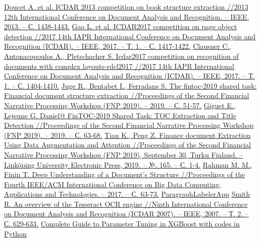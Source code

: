 \documentclass[10pt, a4paper]{ieeeconf}
\begin{document}
\begin{thebibliography}{99}

 \href{https://hal.archives-ouvertes.fr/hal-01073396/document}{Doucet A. et al. ICDAR 2013 competition on book structure extraction //2013 12th International Conference on Document Analysis and Recognition. – IEEE, 2013. – С. 1438-1443.}
 \href{https://ieeexplore.ieee.org/abstract/document/8270162}{Gao L. et al. ICDAR2017 competition on page object detection //2017 14th IAPR International Conference on Document Analysis and Recognition (ICDAR). – IEEE, 2017. – Т. 1. – С. 1417-1422.}
 \href{https://usir.salford.ac.uk/id/eprint/44369/1/ICDAR2017%20Competition%20on%20Recognition%20of%20Documents%20with%20Complex%20Layouts.pdf}{Clausner C., Antonacopoulos A., Pletschacher S. Icdar2017 competition on recognition of documents with complex layouts-rdcl2017 //2017 14th IAPR International Conference on Document Analysis and Recognition (ICDAR). – IEEE, 2017. – Т. 1. – С. 1404-1410.}
 \href{https://www.aclweb.org/anthology/W19-6407.pdf}{Juge R., Bentabet I., Ferradans S. The fintoc-2019 shared task: Financial document structure extraction //Proceedings of the Second Financial Narrative Processing Workshop (FNP 2019). – 2019. – С. 51-57.}
 \href{https://www.aclweb.org/anthology/W19-6409.pdf}{Giguet E., Lejeune G. Daniel@ FinTOC-2019 Shared Task: TOC Extraction and Title Detection //Proceedings of the Second Financial Narrative Processing Workshop (FNP 2019). – 2019. – С. 63-68.}
 \href{http://www.ep.liu.se/ecp/165/001/ecp19165001.pdf}{Tian K., Peng Z. Finance document Extraction Using Data Augmentation and Attention //Proceedings of the Second Financial Narrative Processing Workshop (FNP 2019), September 30, Turku Finland. – Linköping University Electronic Press, 2019. – №. 165. – С. 1-4.}
 \href{https://dl.acm.org/doi/pdf/10.1145/3148055.3148080}{Rahman M. M., Finin T. Deep Understanding of a Document's Structure //Proceedings of the Fourth IEEE/ACM International Conference on Big Data Computing, Applications and Technologies. – 2017. – С. 63-73.}
 \href{https://github.com/dronperminov/ParagraphLabelerApp}{ParagraphLabelerApp}
 \href{https://research.google/pubs/pub33418.pdf}{Smith R. An overview of the Tesseract OCR engine //Ninth International Conference on Document Analysis and Recognition (ICDAR 2007). – IEEE, 2007. – Т. 2. – С. 629-633.}
 \href{https://www.analyticsvidhya.com/blog/2016/03/complete-guide-parameter-tuning-xgboost-with-codes-python/}{Complete Guide to Parameter Tuning in XGBoost with codes in Python}

\end{thebibliography}
\end{document}
